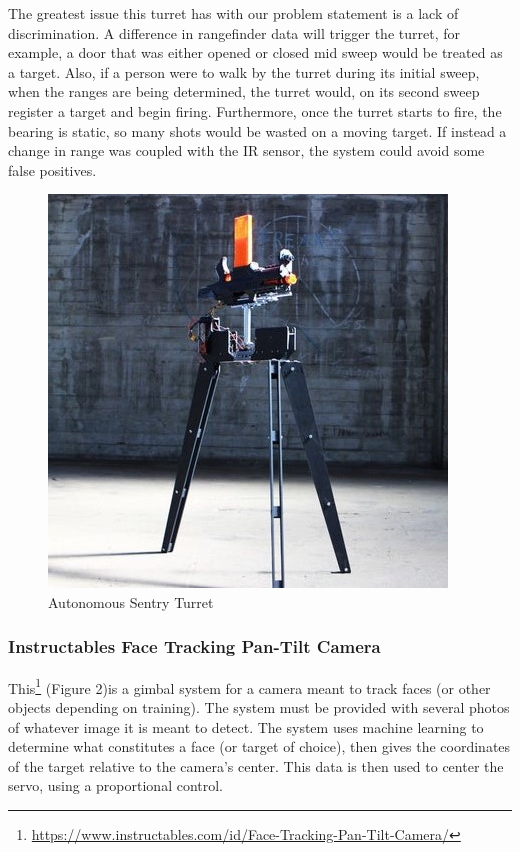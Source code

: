 The greatest issue this turret has with our problem statement is a lack of discrimination. A difference in rangefinder data will trigger the turret, for example, a door that was either opened or closed mid sweep would be treated as a target. Also, if a person were to walk by the turret during its initial sweep, when the ranges are being determined, the turret would, on its second sweep register a target and begin firing. Furthermore, once the turret starts to fire, the bearing is static, so many shots would be wasted on a moving target. If instead a change in range was coupled with the IR sensor, the system could avoid some false positives.
\begin{figure}[ht]
    \centering
    \includegraphics[scale=.4]{autosentTurret.jpg}
    \caption{Autonomous Sentry Turret}
    \label{fig:first turret}
\end{figure}



\subsubsection{Instructables Face Tracking Pan-Tilt Camera}
This\footnote{\url{https://www.instructables.com/id/Face-Tracking-Pan-Tilt-Camera/}} (Figure 2)is a gimbal system for a camera meant to track faces (or other objects depending on training). The system must be provided with several photos of whatever image it is meant to detect. The system uses machine learning to determine what constitutes a face (or target of choice), then gives the coordinates of the target relative to the camera’s center. This data is then used to center the servo, using a proportional control.
        
